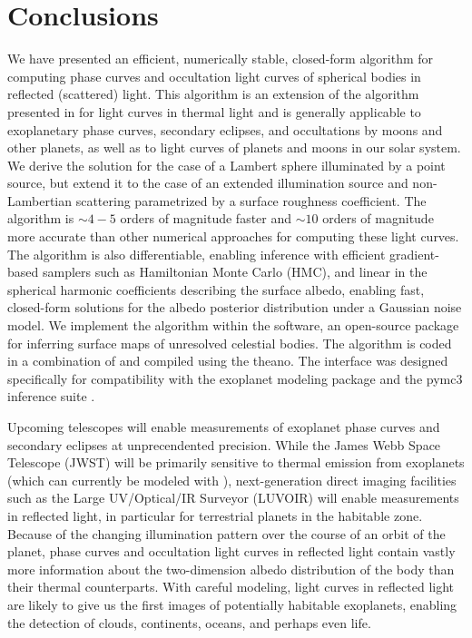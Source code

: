 \documentclass[modern]{aastex62}
\begin{document}
\section{Conclusions}
\label{sec:conclusions}

We have presented an efficient, numerically stable,
closed-form algorithm for computing phase curves
and occultation light curves of spherical bodies in reflected
(scattered) light.
This algorithm is an extension of the algorithm presented
in \citet{Luger2019} for light curves in thermal light and
is generally applicable to exoplanetary phase
curves, secondary eclipses, and occultations by moons and other planets,
as well as to light curves of planets and moons in our solar system.
We derive the solution for the case of a Lambert sphere illuminated by a
point source, but extend it to the case of an extended illumination
source and non-Lambertian scattering parametrized by a surface roughness
coefficient.
%
The algorithm is ${\sim}4-5$ orders of magnitude faster
and ${\sim}10$ orders of magnitude more accurate than other numerical
approaches for computing these light curves. The algorithm is
also differentiable, enabling inference with efficient gradient-based samplers
such as Hamiltonian Monte Carlo (HMC), and linear in the spherical
harmonic coefficients describing the surface albedo, enabling fast,
closed-form solutions for the albedo posterior distribution under a
Gaussian noise model.
%
We implement the algorithm within the \starry software, an open-source \Python
package for inferring surface maps of unresolved celestial bodies. The
algorithm is coded in a combination of \cpp and \Python compiled using
the \textsf{theano}. The interface was designed specifically for
compatibility with the \textsf{exoplanet} modeling package
\citep{exoplanet} and the \textsf{pymc3} inference suite \citep{pymc3}.

Upcoming telescopes will enable measurements of exoplanet phase curves
and secondary eclipses at unprecendented precision. While the
James Webb Space Telescope (JWST) will be primarily sensitive to thermal
emission from exoplanets (which can currently be modeled with \starry),
next-generation direct imaging facilities such as the
Large UV/Optical/IR Surveyor (LUVOIR)
will enable measurements in reflected light, in particular for terrestrial
planets in the habitable zone. Because of the changing illumination
pattern over the course of an orbit of the planet, phase curves and
occultation light curves in reflected
light contain vastly more information about the two-dimension albedo
distribution of the body than their thermal counterparts.
With careful modeling, light curves in reflected light are likely to give us
the first images of potentially habitable exoplanets, enabling the
detection of clouds, continents, oceans, and perhaps even life.
\end{document}
